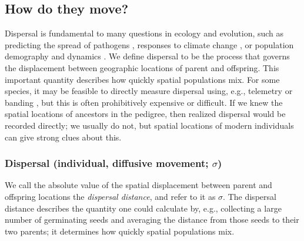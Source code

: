 \documentclass{ar-1col}
\begin{document}
\subsection{How do they move?}

Dispersal is fundamental to many questions in ecology and evolution,
such as
predicting the spread of pathogens \citep{BiekReal2010},
responses to climate change \citep{parmesan2006},
or population demography and dynamics \citep{schreiber2010interactive}.
We define dispersal to be the process that governs 
the displacement between geographic locations of parent and offspring.
This important quantity describes how quickly spatial populations mix.
For some species,
it may be feasible to directly measure dispersal 
using, e.g., telemetry or banding \citep{Cayuela2018demographic},
but this is often prohibitively expensive or difficult.
If we knew the spatial locations of ancestors in the pedigree,
then realized dispersal would be recorded directly;
we usually do not, but spatial locations of modern individuals
can give strong clues about this.


\subsubsection{Dispersal (individual, diffusive movement; $\sigma$)}

We call the absolute value of the spatial displacement between parent and offspring locations
the \textit{dispersal distance}, and refer to it as $\sigma$.
The dispersal distance describes the quantity one could calculate by,
e.g., collecting a large number of germinating seeds
and averaging the distance from those seeds to their two parents;
it determines how quickly spatial populations mix.
\end{document}
